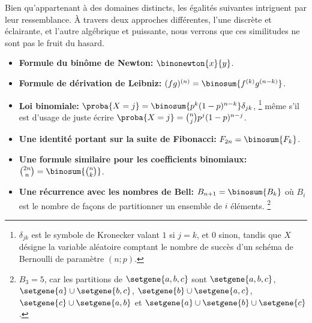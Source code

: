 Bien qu'appartenant à des domaines distincts, les égalités suivantes intriguent par leur ressemblance.
%
À travers deux approches différentes, l'une discrète et éclairante, et l'autre algébrique et puissante, nous verrons que ces similitudes ne sont pas le fruit du hasard.
%
\begin{itemize}
    \item \textbf{Formule du binôme de Newton:}
    $\binonewton{x}{y}$.


    \item \textbf{Formule de dérivation de Leibniz:}
    $(fg)^{(n)} = \binosum{f^{(k)} g^{(n-k)}}$.


    \item \textbf{Loi binomiale:}
    $\proba{X = j} = \binosum{p^k (1 - p)^{n-k}} \delta_{jk}$,%
    \footnote{
        $\delta_{jk}$ est le symbole de Kronecker valant $1$ si $j=k$, et $0$ sinon,
        tandis que
        $X$ désigne la variable aléatoire comptant le nombre de succès d'un schéma de Bernoulli de paramètre $(n ; p)$.
    }
    même s'il est d'usage de juste écrire
    $\proba{X = j} =\binom{n}{j} p^j (1 - p)^{n-j}$.


    \item \textbf{Une identité portant sur la suite de Fibonacci:}
    $F_{2n} = \binosum{F_k}$.


    \item \textbf{Une formule similaire pour les coefficients binomiaux:}
    $\binom{2n}{n} = \binosum{\binom{n}{k}}$.


    \item \textbf{Une récurrence avec les nombres de Bell:}
    $B_{n+1} = \binosum{B_k}$ où $B_i$ est le nombre de façons de partitionner un ensemble de $i$ éléments.%
    \footnote{
        $B_3 = 5$,
        car les partitions de $\setgene{ a , b , c }$ sont
        $\setgene{ a , b , c }$,
        $\setgene{ a } \cup \setgene{ b , c }$,
        $\setgene{ b } \cup \setgene{ a , c }$,
        $\setgene{ c } \cup \setgene{ a , b }$
        et
        $\setgene{ a } \cup \setgene{ b } \cup \setgene{ c }$.
    }
\end{itemize}

